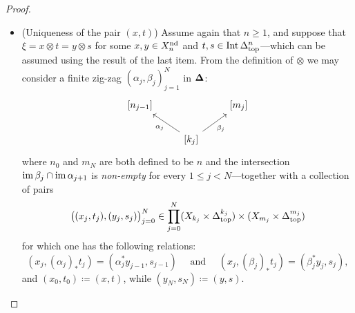 \begin{proof}
\begin{itemize}
        \item (Uniqueness of the pair \((x, t)\)) Assume again that \(n \geq 1\), and
              suppose that \(\xi = x \otimes t = y \otimes s\) for some
              \(x, y \in X_n^{\operatorname{nd}}\) and \(t, s \in \operatorname{Int} \Delta_{\text{top}}^n\)---which can be
              assumed using the result of the last item. From the definition of \(\otimes\)
              we may consider a finite zig-zag \((\alpha_j, \beta_j)_{j=1}^N\) in \({\mathbf{\Delta}}\):
              \[
                  \begin{tikzcd}
                      {[n_{j-1}]}
                      &&{[m_j]}
                      \\
                      &{[k_j] \ar[lu, "\alpha_j"]} \ar[ru, "\beta_j"']
                      &
                  \end{tikzcd}
              \]
              where \(n_0\) and \(m_N\) are both defined to be \(n\) and the intersection
              \(\operatorname{im} \beta_j \cap \operatorname{im} \alpha_{j+1}\) is \emph{non-empty} for every
              \(1 \leq j < N\)---together with a collection of pairs
              \[
                  \big((x_j, t_j), (y_j, s_j)\big)_{j=0}^N
                  \in \prod_{j=0}^N (X_{k_j} \times \Delta_{\text{top}}^{k_j})
                  \times (X_{m_j} \times \Delta_{\text{top}}^{m_j})
              \]
              for which one has the following relations:
              \[
                  (x_j, (\alpha_j)_{*} t_j) = (\alpha_j^{*} y_{j-1}, s_{j-1})
                  \quad \text{ and } \quad
                  (x_j, (\beta_j)_{*} t_j) = (\beta_j^{*} y_j, s_j),
              \]
              and \((x_0, t_0) \coloneq (x, t)\), while \((y_N, s_N) \coloneq (y, s)\).


\end{itemize}
\end{proof}
